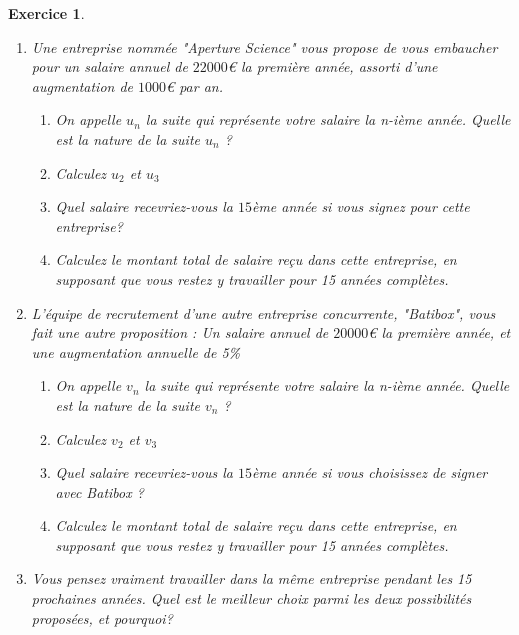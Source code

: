 \documentclass[11pt,a4paper]{exam}
\newtheorem{exo}{Exercice}
\begin{document}
\begin{exo}
\begin{enumerate}
    \item Une entreprise nommée "Aperture Science" vous propose de vous embaucher pour un salaire annuel de $22000$€ la première année, assorti d'une augmentation de $1000$€ par an.
    \begin{enumerate}
        \item On appelle $u_n$ la suite qui représente votre salaire la n-ième année. Quelle est la nature de la suite $u_n$ ? 
        \item Calculez $u_2$ et $u_3$
        \item Quel salaire recevriez-vous la $15$ème année si vous signez pour cette entreprise?
        \item Calculez le montant total de salaire reçu dans cette entreprise, en supposant que vous restez y travailler pour 15 années complètes.
    \end{enumerate}
    \item L'équipe de recrutement d'une autre entreprise concurrente, "Batibox", vous fait une autre proposition : Un salaire annuel de $20000$€ la première année, et une augmentation annuelle de 5\%
    \begin{enumerate}
        \item On appelle $v_n$ la suite qui représente votre salaire la n-ième année. Quelle est la nature de la suite $v_n$ ? 
        \item Calculez $v_2$ et $v_3$
        \item Quel salaire recevriez-vous la $15$ème année si vous choisissez de signer avec Batibox ?
        \item Calculez le montant total de salaire reçu dans cette entreprise, en supposant que vous restez y travailler pour 15 années complètes.
    \end{enumerate}
    \item Vous pensez vraiment travailler dans la même entreprise pendant les 15 prochaines années. Quel est le meilleur choix parmi les deux possibilités proposées, et pourquoi?  
\end{enumerate}
\end{exo}
\end{document}
